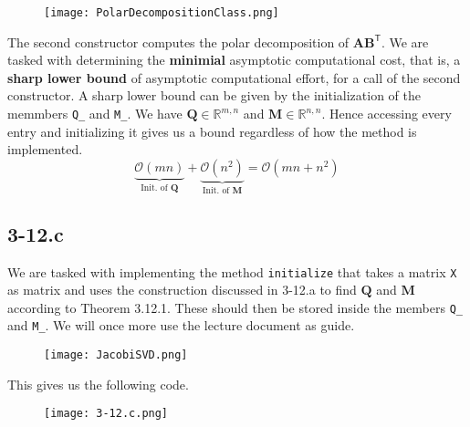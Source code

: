 \documentclass{article}
\begin{document}
\begin{figure}[!hbt]
    \centering
\texttt{[image: PolarDecompositionClass.png]}
\end{figure}
The second constructor computes the polar decomposition of $\mathbf{A}\mathbf{B}^{\mathsf{T}}$. We are tasked with determining the \textbf{minimial} asymptotic computational cost, that is, a \textbf{sharp lower bound} of asymptotic computational effort, for a call of the second constructor. A sharp lower bound can be given by the initialization of the memmbers \verb|Q_| and \verb|M_|. We have $\mathbf{Q}\in \mathbb{R}^{m,n}$ and $\mathbf{M}\in\mathbb{R}^{n,n}$. Hence accessing every entry and initializing it gives us a bound regardless of how the method is implemented.
\begin{equation*}
    \underbrace{\mathcal{O}\left(mn\right)}_{\text{Init. of }\mathbf{Q}} + \underbrace{\mathcal{O}\left(n^{2}\right)}_{\text{Init. of }\mathbf{M}} = \mathcal{O}\left(mn + n^{2}\right)
\end{equation*}
\subsection*{3-12.c}
We are tasked with implementing the method \verb|initialize| that takes a matrix \verb|X| as matrix and uses the construction discussed in 3-12.a to find $\mathbf{Q}$ and $\mathbf{M}$ according to Theorem 3.12.1. These should then be stored inside the members \verb|Q_| and \verb|M_|. We will once more use the lecture document as guide.
\begin{figure}[!hbt]
    \centering
\texttt{[image: JacobiSVD.png]}
\end{figure}

\noindent This gives us the following code.
\begin{figure}[!hbt]
    \centering
\texttt{[image: 3-12.c.png]}
\end{figure}
\end{document}
